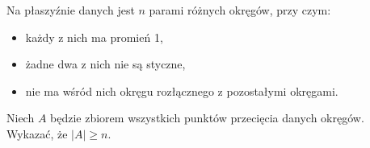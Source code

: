



\noindent
Na płaszyźnie danych jest $n$ parami różnych okręgów, przy czym:
\begin{itemize}
	\item każdy z nich ma promień 1,
	\item żadne dwa z nich nie są styczne,
	\item nie ma wśród nich okręgu rozłącznego z pozostałymi okręgami.
\end{itemize}

\noindent
Niech $A$ będzie zbiorem wszystkich punktów przecięcia danych okręgów. Wykazać, że $|A| \geqslant n$.




